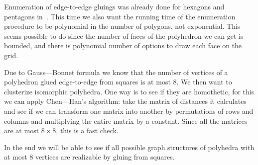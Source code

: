 \documentclass[a4paper,11pt]{article}
\begin{document}
Enumeration of edge-to-edge gluings was already done for hexagons and pentagons
in~\cite{kl17-hex,alz-penta}. This time we also want the running time of the enumeration
procedure to be polynomial in the number of polygons, not exponential. This seems
possible to do since the number of faces of the polyhedron we can get is bounded,
and there is polynomial number of options to draw each face on the grid.

Due to Gauss—Bonnet formula we know that the number of vertices of a polyhedron
glued edge-to-edge from squares is at most 8. We then want to clusterize isomorphic
polyhedra. One way is to see if they are homothetic, for this we can apply Chen—Han's
algorithm: take the matrix of distances it calculates and see if we can transform
one matrix into another by permutations of rows and columns and multiplying
the entire matrix by a constant. Since all the matrices are at most $8 \times 8$,
this is a fast check.

In the end we will be able to see if all possible graph structures of polyhedra
with at most 8 vertices are realizable by gluing from squares.



{}

\end{document}
